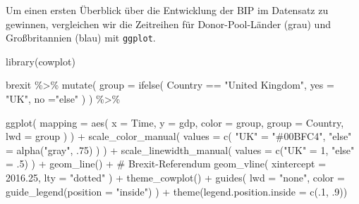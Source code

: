 \documentclass[
  a4paper,
  DIV=11,
  oneside]{scrreprt}
\newenvironment{Shaded}{\begin{snugshade}}{\end{snugshade}}
\newcommand{\AttributeTok}[1]{\textcolor[rgb]{0.40,0.45,0.13}{#1}}
\newcommand{\CommentTok}[1]{\textcolor[rgb]{0.37,0.37,0.37}{#1}}
\newcommand{\DecValTok}[1]{\textcolor[rgb]{0.68,0.00,0.00}{#1}}
\newcommand{\FloatTok}[1]{\textcolor[rgb]{0.68,0.00,0.00}{#1}}
\newcommand{\FunctionTok}[1]{\textcolor[rgb]{0.28,0.35,0.67}{#1}}
\newcommand{\NormalTok}[1]{\textcolor[rgb]{0.00,0.23,0.31}{#1}}
\newcommand{\OtherTok}[1]{\textcolor[rgb]{0.00,0.23,0.31}{#1}}
\newcommand{\SpecialCharTok}[1]{\textcolor[rgb]{0.37,0.37,0.37}{#1}}
\newcommand{\StringTok}[1]{\textcolor[rgb]{0.13,0.47,0.30}{#1}}
\begin{document}
Um einen ersten Überblick über die Entwicklung der BIP im Datensatz zu
gewinnen, vergleichen wir die Zeitreihen für Donor-Pool-Länder (grau)
und Großbritannien (blau) mit \texttt{ggplot}.

\begin{Shaded}
\begin{Highlighting}[]
\FunctionTok{library}\NormalTok{(cowplot)}

\NormalTok{brexit }\SpecialCharTok{\%\textgreater{}\%}
  \FunctionTok{mutate}\NormalTok{(}
    \AttributeTok{group =} \FunctionTok{ifelse}\NormalTok{(}
\NormalTok{      Country }\SpecialCharTok{==} \StringTok{"United Kingdom"}\NormalTok{, }
      \AttributeTok{yes =} \StringTok{"UK"}\NormalTok{, }
      \AttributeTok{no =}\StringTok{"else"}
\NormalTok{    )}
\NormalTok{  ) }\SpecialCharTok{\%\textgreater{}\%}
  
  \FunctionTok{ggplot}\NormalTok{(}
    \AttributeTok{mapping =} \FunctionTok{aes}\NormalTok{(}
      \AttributeTok{x =}\NormalTok{ Time, }
      \AttributeTok{y =}\NormalTok{ gdp, }
      \AttributeTok{color =}\NormalTok{ group, }
      \AttributeTok{group =}\NormalTok{ Country, }
      \AttributeTok{lwd =}\NormalTok{ group}
\NormalTok{    )}
\NormalTok{  ) }\SpecialCharTok{+}
  \FunctionTok{scale\_color\_manual}\NormalTok{(}
    \AttributeTok{values =} \FunctionTok{c}\NormalTok{(}
      \StringTok{"UK"} \OtherTok{=} \StringTok{"\#00BFC4"}\NormalTok{, }\StringTok{"else"} \OtherTok{=} \FunctionTok{alpha}\NormalTok{(}\StringTok{"gray"}\NormalTok{, .}\DecValTok{75}\NormalTok{)}
\NormalTok{    )}
\NormalTok{  ) }\SpecialCharTok{+}
  \FunctionTok{scale\_linewidth\_manual}\NormalTok{(}
    \AttributeTok{values =} \FunctionTok{c}\NormalTok{(}\StringTok{"UK"} \OtherTok{=} \DecValTok{1}\NormalTok{, }\StringTok{"else"} \OtherTok{=}\NormalTok{ .}\DecValTok{5}\NormalTok{)}
\NormalTok{  ) }\SpecialCharTok{+}
  \FunctionTok{geom\_line}\NormalTok{() }\SpecialCharTok{+}
  \CommentTok{\# Brexit{-}Referendum}
  \FunctionTok{geom\_vline}\NormalTok{(}
    \AttributeTok{xintercept =} \FloatTok{2016.25}\NormalTok{, }
    \AttributeTok{lty =} \StringTok{"dotted"}
\NormalTok{  ) }\SpecialCharTok{+}
  \FunctionTok{theme\_cowplot}\NormalTok{() }\SpecialCharTok{+}
  \FunctionTok{guides}\NormalTok{(}
    \AttributeTok{lwd =} \StringTok{"none"}\NormalTok{, }
    \AttributeTok{color =} \FunctionTok{guide\_legend}\NormalTok{(}\AttributeTok{position =} \StringTok{"inside"}\NormalTok{)}
\NormalTok{  ) }\SpecialCharTok{+}
  \FunctionTok{theme}\NormalTok{(}\AttributeTok{legend.position.inside =} \FunctionTok{c}\NormalTok{(.}\DecValTok{1}\NormalTok{, .}\DecValTok{9}\NormalTok{))}
\end{Highlighting}
\end{Shaded}
\end{document}
